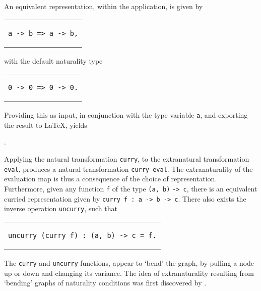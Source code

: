 \documentclass[../Dissertation.tex]{subfiles}
\begin{document}
An equivalent representation, within the application, is given by
\begin{center}
\begin{tabular}{c}
\begin{lstlisting}
a -> b => a -> b,
\end{lstlisting}
\end{tabular}
\end{center}
with the default naturality type
\begin{center}
\begin{tabular}{c}
\begin{lstlisting}
0 -> 0 => 0 -> 0.
\end{lstlisting}
\end{tabular}
\end{center}
Providing this as input, in conjunction with the type variable \lstinline{a}, and exporting the result to LaTeX, yields
\begin{center}
  .
\end{center}
Applying the natural transformation \lstinline{curry}, to the extranatural transformation \lstinline{eval}, produces a natural transformation \lstinline{curry eval}. The extranaturality of the evaluation map is thus a consequence of the choice of representation. Furthermore, given any function \lstinline{f} of the type \lstinline{(a, b)} \lstinline{-> c}, there is an equivalent curried representation given by \lstinline{curry f : a -> b -> c}. There also exists the inverse operation \lstinline{uncurry}, such that 
\begin{center}
\begin{tabular}{c}
\begin{lstlisting}
uncurry (curry f) : (a, b) -> c = f.
\end{lstlisting}
\end{tabular}
\end{center}
The \lstinline{curry} and \lstinline{uncurry} functions, appear to `bend' the graph, by pulling a node up or down and changing its variance. The idea of extranaturality resulting from `bending' graphs of naturality conditions was first discovered by .
\end{document}
